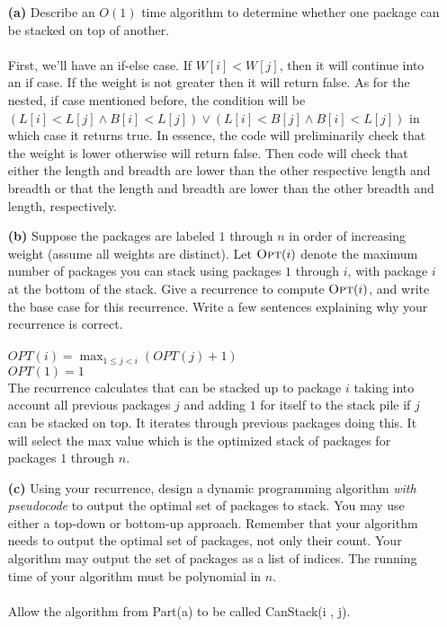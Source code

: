 \documentclass[11pt]{article}
\theoremstyle{definition}
\theoremstyle{theorem}
\newcommand{\opt}{\mbox{{\sc Opt}}}
\begin{document}
\begin{itemize}
	\item[{\bf (a)}] Describe an $O(1)$ time algorithm to determine
	whether one package can be stacked on top of another. \\\\
 First, we'll have an if-else case. If $W[i] < W[j]$, then it will continue into an if case. If the weight is not greater then it will return false. As for the nested, if case mentioned before, the condition will be $(L[i] < L[j] \land B[i] < L[j]) \lor (L[i] < B[j] \land B[i] < L[j])$ in which case it returns true. In essence, the code will preliminarily check that the weight is lower otherwise will return false. Then code will check that either the length and breadth are lower than the other respective length and breadth or that the length and breadth are lower than the other breadth and length, respectively.
	
	\item[{\bf (b)}] Suppose the packages are labeled $1$ through $n$ in
	order of increasing weight (assume all weights are distinct).  Let
	$\opt(i)$ denote the maximum number of packages you can stack using
	packages $1$ through $i$, with package $i$ at the bottom of the
	stack.  Give a recurrence to compute $\opt(i)$, and write the base
	case for this recurrence.  Write a few sentences explaining why your
	recurrence is correct. \\\\
$OPT(i) = \max_{1 \leq j < i} (OPT(j) + 1)$ \\
$OPT(1) = 1$ \\
The recurrence calculates that can be stacked up to package $i$ taking into account all previous packages $j$ and adding $1$ for itself to the stack pile if $j$ can be stacked on top. It iterates through previous packages doing this. It will select the max value which is the optimized stack of packages for packages $1$ through $n$.

\newpage

	\item[{\bf (c)}] Using your recurrence, design a dynamic programming
	algorithm {\em with pseudocode} to output the optimal set of packages to stack.  You may
	use either a top-down or bottom-up approach.  Remember that your
	algorithm needs to output the optimal set of packages, not only
	their count.  Your algorithm may output the set of packages as a
	list of indices.  The running time of your algorithm must be
	polynomial in $n$. \\\\
 Allow the algorithm from Part(a) to be called CanStack(i , j).


\end{itemize}
\end{document}

